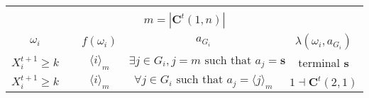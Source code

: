 \documentclass[12pt,letter]{article}
\newcommand{\Kappa}{\mathbf{C}}
\theoremstyle{definition}
\theoremstyle{remark}
\theoremstyle{claim}
\begin{document}
\begin{table}[!htbp]
\begin{center}
\begin{tabular}{c c | c | c | c}
\hline
\\
\multicolumn{5}{c}{$m= |\Kappa^t(1,n)|$}\\
$\omega_i$ 	 & 	   &	$f(\omega_i)$  &	$a_{G_i}$ & $\lambda(\omega_i,a_{G_i})$ \\
\hline
\hline
$X^{t+1}_i\geq k$ 	& 						& $\langle i \rangle_m$		&  $\exists j\in G_i, j=m\text{ such that } a_j=\textbf{s}$	& terminal \textbf{s}\\
$X^{t+1}_i\geq k$ 	& 						& $\langle i \rangle_m$		&  $\forall j\in G_i\text{ such that } a_j= \langle j \rangle_m$	& $1\dashv \Kappa^t(2,1)$\\
\hline
\end{tabular}
\end{center}
\end{table}


\clearpage
\end{document}
